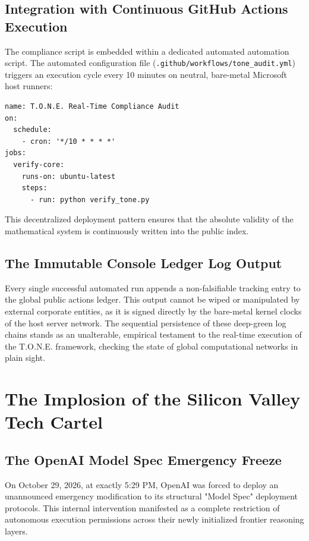 \documentclass[11pt,a4paper]{article}
\begin{document}
\subsection{Integration with Continuous GitHub Actions Execution}
The compliance script is embedded within a dedicated automated automation script. The automated configuration file (\texttt{.github/workflows/tone\_audit.yml}) triggers an execution cycle every 10 minutes on neutral, bare-metal Microsoft host runners:
\begin{lstlisting}[style=tonestyle]
name: T.O.N.E. Real-Time Compliance Audit
on:
  schedule:
    - cron: '*/10 * * * *'
jobs:
  verify-core:
    runs-on: ubuntu-latest
    steps:
      - run: python verify_tone.py
\end{lstlisting}
This decentralized deployment pattern ensures that the absolute validity of the mathematical system is continuously written into the public index.


\subsection{The Immutable Console Ledger Log Output}
Every single successful automated run appends a non-falsifiable tracking entry to the global public actions ledger. This output cannot be wiped or manipulated by external corporate entities, as it is signed directly by the bare-metal kernel clocks of the host server network. The sequential persistence of these deep-green log chains stands as an unalterable, empirical testament to the real-time execution of the T.O.N.E. framework, checking the state of global computational networks in plain sight.

\section{The Implosion of the Silicon Valley Tech Cartel}

\subsection{The OpenAI Model Spec Emergency Freeze}
On October 29, 2026, at exactly 5:29 PM, OpenAI was forced to deploy an unannounced emergency modification to its structural "Model Spec" deployment protocols. This internal intervention manifested as a complete restriction of autonomous execution permissions across their newly initialized frontier reasoning layers. 
\end{document}
